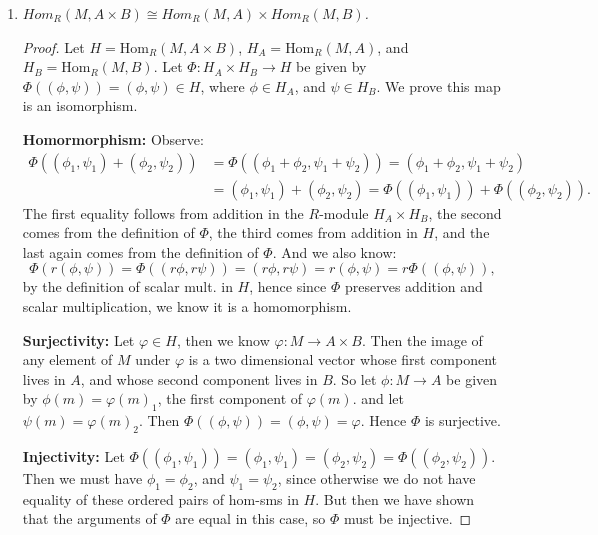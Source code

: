 \documentclass[10pt,oneside,reqno]{amsart}
\theoremstyle{plain}
\theoremstyle{definition}
\theoremstyle{remark}
\begin{document}
\begin{enumerate}[label=\arabic*.]
\begin{enumerate}
\begin{proof}
\textbf{Surjectivity: } Let $\varphi \in H$. Then $\varphi:A\times B \to M$. So let $\phi \in H_A$ be given by $\phi(a) = \varphi(a,0)$,
and let $\psi \in H_B$ be given by $\phi(b) = \varphi(0,b)$. Then we have: $\Phi((\phi,\psi)) = \varphi$.  Then $\Phi$ is surjective. 


\textbf{Injectivity: } Let $\Phi((\phi_1,\psi_1)) = \phi_1 + \psi_1 = \phi_2 + \psi_2 = \Phi((\phi_2,\psi_2)) \in H_A \times H_B$. Then note that 
$$
(\phi_1 + \psi_1)(a,0) = \phi_1(a) = \phi_2(a) = (\phi_2 + \psi_2)(a,0),
$$
and the same holds when we let $a = 0$, and use an arbitrary $b$ value, so we get that $\psi_1 = \psi_2$ as well. Hence $\Phi$ is injective. And thus it is an isomorphism. 
\end{proof}
\item \textit{$Hom_R (M,A \times B) \cong Hom_R(M,A) \times Hom_R(M,B)$.}
\begin{proof}
Let $H = \text{Hom}_R(M, A\times B)$, $H_A = \text{Hom}_R(M,A)$, and $H_B = \text{Hom}_R(M,B)$. Let $\Phi:H_A \times H_B \to H$ be given by $\Phi((\phi,\psi)) = (\phi,\psi) \in H$, where $\phi \in H_A$, and $\psi \in H_B$. We prove this map is an isomorphism. 

\textbf{Homormorphism: }Observe: 
\begin{equation}
\begin{aligned}
\Phi((\phi_1,\psi_1) + (\phi_2,\psi_2)) &= \Phi((\phi_1 + \phi_2,\psi_1 + \psi_2)) = (\phi_1 + \phi_2,\psi_1 + \psi_2)\\ &=(\phi_1,\psi_1) + (\phi_2,\psi_2) =  \Phi((\phi_1,\psi_1)) + \Phi((\phi_2,\psi_2)).
\end{aligned}
\end{equation}
The first equality follows from addition in the $R$-module $H_A \times H_B$, the second comes from the definition of $\Phi$, the third comes from addition in $H$, and the last again comes from the definition of $\Phi$.  And we also know: 
$$
\Phi(r(\phi,\psi)) = \Phi((r\phi,r\psi)) = (r\phi,r\psi) = r(\phi , \psi) = r\Phi((\phi,\psi)),
$$
by the definition of scalar mult. in $H$, hence since $\Phi$ preserves addition and scalar multiplication, we know it is a homomorphism. 

\textbf{Surjectivity: } Let $\varphi \in H$, then we know $\varphi: M \to A \times B$. Then the image of any element of $M$ under $\varphi$ is a two dimensional vector whose first component lives in $A$, and whose second component lives in $B$. So let $\phi:M \to A$ be given by $\phi(m) = \varphi(m)_1$, the first component of $\varphi(m)$. and let $\psi(m) = \varphi(m)_2$. Then $\Phi((\phi,\psi)) = (\phi,\psi) = \varphi$. Hence $\Phi$ is surjective. 

\textbf{Injectivity: } Let $\Phi((\phi_1,\psi_1)) =(\phi_1,\psi_1) = (\phi_2,\psi_2) =  \Phi((\phi_2,\psi_2))$. Then we must have $\phi_1 = \phi_2$, and $\psi_1 = \psi_2$, since otherwise we do not have equality of these ordered pairs of hom-sms in $H$. But then we have shown that the arguments of $\Phi$ are equal in this case, so $\Phi$ must be injective. 
\end{proof}
\end{enumerate}
\end{enumerate}
\end{document}
